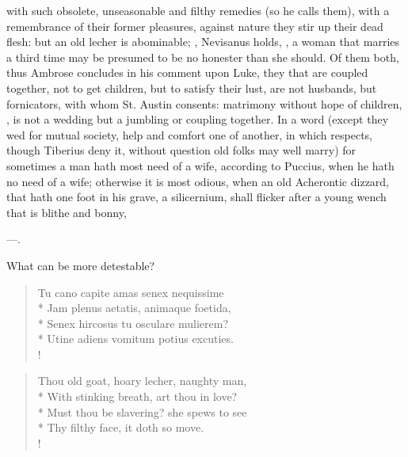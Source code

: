 with such obsolete, unseasonable and filthy remedies (so he calls
them), with a remembrance of their former pleasures, against nature
they stir up their dead flesh: but an old lecher is abominable; , Nevisanus holds, , a woman that marries a third time may be presumed to be no
honester than she should. Of them both, thus Ambrose concludes in his
comment upon Luke, they that are coupled together, not to get
children, but to satisfy their lust, are not husbands, but fornicators,
with whom St. Austin consents: matrimony without hope of children, , is not a wedding but a jumbling
or coupling together. In a word (except they wed for mutual society,
help and comfort one of another, in which respects, though
Tiberius deny it, without question old folks may well marry) for
sometimes a man hath most need of a wife, according to Puccius, when he
hath no need of a wife; otherwise it is most odious, when an old
Acherontic dizzard, that hath one foot in his grave, a silicernium,
shall flicker after a young wench that is blithe and bonny,

---.

What can be more detestable?
%
\begin{latin}%
\begin{verse}%
Tu cano capite amas senex nequissime\\*
Jam plenus aetatis, animaque foetida,\\*
Senex hircosus tu osculare mulierem?\\*
Utine adiens vomitum potius excuties.\\!
\end{verse}%
\end{latin}%
\translationrule%
\begin{verse}%
Thou old goat, hoary lecher, naughty man,\\*
With stinking breath, art thou in love?\\*
Must thou be slavering? she spews to see\\*
Thy filthy face, it doth so move.\\!
\end{verse}%
%

